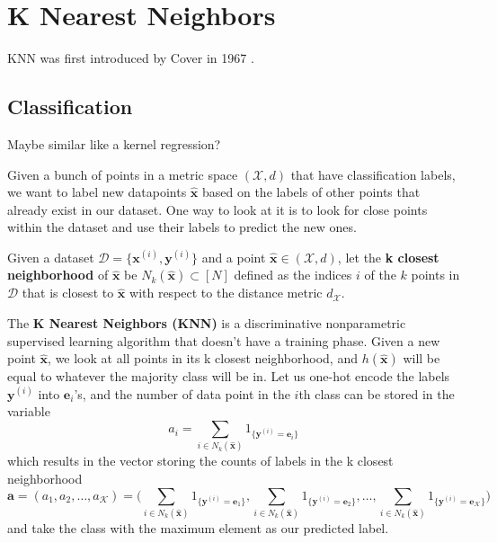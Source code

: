 \section{K Nearest Neighbors} 

  KNN was first introduced by Cover in 1967 \cite{1967cover}. 

\subsection{Classification}

  \begin{question}[To Do]
    Maybe similar like a kernel regression?  
  \end{question}

  Given a bunch of points in a metric space $(\mathcal{X}, d)$ that have classification labels, we want to label new datapoints $\hat{\mathbf{x}}$ based on the labels of other points that already exist in our dataset. One way to look at it is to look for close points within the dataset and use their labels to predict the new ones. 

  \begin{definition}
    Given a dataset $\mathcal{D} = \{\mathbf{x}^{(i)}, \mathbf{y}^{(i)}\}$ and a point $\hat{\mathbf{x}} \in (\mathcal{X}, d)$, let the \textbf{k closest neighborhood} of $\hat{\mathbf{x}}$ be $N_k (\hat{\mathbf{x}}) \subset [N]$ defined as the indices $i$ of the $k$ points in $\mathcal{D}$ that is closest to $\hat{\mathbf{x}}$ with respect to the distance metric $d_\mathcal{X}$. 
  \end{definition}

  \begin{definition}
    The \textbf{K Nearest Neighbors (KNN)} is a discriminative nonparametric supervised learning algorithm that doesn't have a training phase. Given a new point $\hat{\mathbf{x}}$, we look at all points in its k closest neighborhood, and $h(\hat{\mathbf{x}})$ will be equal to whatever the majority class will be in. Let us one-hot encode the labels $\mathbf{y}^{(i)}$ into $\mathbf{e}_i$'s, and the number of data point in the $i$th class can be stored in the variable 
    \begin{equation}
      a_i = \sum_{i \in N_k (\hat{\mathbf{x}})} 1_{\{\mathbf{y}^{(i)} = \mathbf{e}_i\}}
    \end{equation}
    which results in the vector storing the counts of labels in the k closest neighborhood 
    \begin{equation}
      \mathbf{a} = (a_1, a_2, \ldots, a_\mathcal{K}) = \bigg( \sum_{i \in N_k (\hat{\mathbf{x}})} 1_{\{\mathbf{y}^{(i)} = \mathbf{e}_1\}}, \sum_{i \in N_k (\hat{\mathbf{x}})} 1_{\{\mathbf{y}^{(i)} = \mathbf{e}_2\}}, \ldots, \sum_{i \in N_k (\hat{\mathbf{x}})} 1_{\{\mathbf{y}^{(i)} = \mathbf{e}_\mathcal{K}\}} \bigg) 
    \end{equation}
    and take the class with the maximum element as our predicted label. 
  \end{definition}

